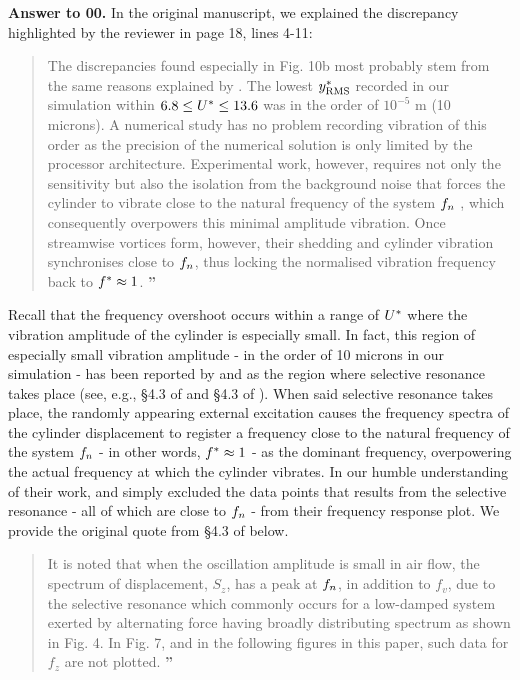 \documentclass[10pt]{article}
\newcounter{question}
\newcommand{\name}{00}
\newcommand{\answer}[1]{\noindent \textbf{Answer to \name.\thequestion}\vskip 0.25cm \noindent #1 \mbox{}\\}
\begin{document}
\answer{
  In the original manuscript, we explained the discrepancy highlighted by the reviewer in page 18, lines 4-11:

  \begin{quotation}
    \noindent {\Large \textbf{``}} The discrepancies found especially in Fig. 10b most probably stem from the same reasons explained by \citet{Nguyen2012}. The lowest  $y^{*}_{\text{RMS}}$ recorded in our simulation within  $6.8 \leq U^{*} \leq 13.6$ was in the order of $10^{-5}$ \si{\metre} (10 microns). A numerical study has no problem recording vibration of this order as the precision of the numerical solution is only limited by the processor architecture. Experimental work, however, requires not only the sensitivity but also the isolation from the background noise that forces the cylinder to vibrate close to the natural frequency of the system  $f_{n}$ \citep{Nguyen2012}, which consequently overpowers this minimal amplitude vibration. Once streamwise vortices form, however, their shedding and cylinder vibration synchronises close to $f_{n}$, thus locking the normalised vibration frequency back to  $f^{*} \approx 1$. {\Large \textbf{''}}
  \end{quotation}

  Recall that the frequency overshoot occurs within a range of $U^{*}$ where the vibration amplitude of the cylinder is especially small. In fact, this region of especially small vibration amplitude - in the order of 10 microns in our simulation - has been reported by \citet{Nguyen2012} and \citet{Nguyen2010} as the region where selective resonance takes place (see, e.g., \S4.3 of \citet{Nguyen2010} and \S4.3 of \citet{Nguyen2012}). When said selective resonance takes place, the randomly appearing external excitation causes the frequency spectra of the cylinder displacement to register a frequency close to the natural frequency of the system $f_{n}$ - in other words, $f^{*} \approx 1$ - as the dominant frequency, overpowering the actual frequency at which the cylinder vibrates. In our humble understanding of their work, \citet{Nguyen2010} and \citet{Nguyen2012} simply excluded the data points that results from the selective resonance - all of which are close to $f_{n}$ - from their frequency response plot. We provide the original quote from \S4.3 of \citet{Nguyen2012} below.

  \begin{quotation}
    \noindent {\Large \textbf{``}} It is noted that when the oscillation amplitude is small in air flow, the spectrum of displacement, $S_{z}$, has a peak at $f_{n}$, in addition to $f_{v}$, due to the selective resonance which commonly occurs for a low-damped system exerted by alternating force having broadly distributing spectrum as shown in Fig. 4. In Fig. 7, and in the following figures in this paper, such data for $f_{z}$ are not plotted. {\Large \textbf{''}}
  \end{quotation}

}
\end{document}
